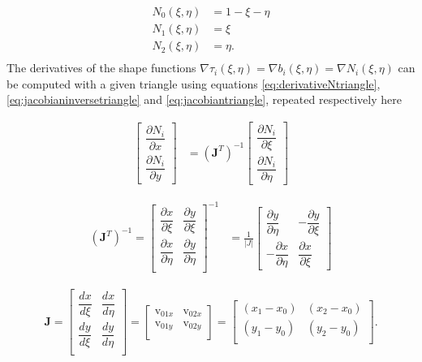 \documentclass[11pt,letterpaper,titlepage]{article}
\newcommand{\beq}{\begin{equation*}
\begin{aligned}}
\newcommand{\eeq}{\end{aligned}
\end{equation*}}
\numberwithin{equation}{section}
\begin{document}
\beq 
N_0(\xi,\eta) &= 1 - \xi - \eta \\
N_1(\xi,\eta) &= \xi \\
N_2(\xi,\eta) &= \eta. \\
\eeq 
\newline
The derivatives of the shape functions $\nabla \tau_i(\xi,\eta) = \nabla b_i(\xi,\eta) = \nabla N_i(\xi,\eta)$ can be computed with a given triangle using equations \ref{eq:derivativeNtriangle}, \ref{eq:jacobianinversetriangle} and \ref{eq:jacobiantriangle}, repeated respectively here

\begingroup
\renewcommand*{\arraystretch}{1.5}
\beq
\begin{bmatrix}
\dfrac{\partial N_i}{\partial x} \\
\dfrac{\partial N_i}{\partial y}
\end{bmatrix}
&=
(\mathbf{J}^T)^{-1}
\begin{bmatrix}
\dfrac{\partial N_i}{\partial \xi} \\
\dfrac{\partial N_i}{\partial \eta}
\end{bmatrix}
\eeq 
\endgroup

\begingroup
\renewcommand*{\arraystretch}{1.5}
\beq
(\mathbf{J}^T)^{-1} =
\begin{bmatrix}
\dfrac{\partial x}{\partial \xi}   &\dfrac{\partial y}{\partial \xi} \\
\dfrac{\partial x}{\partial \eta}   &\dfrac{\partial y}{\partial \eta} \\
\end{bmatrix}^{-1}
&=
\frac{1}{|J|}
\begin{bmatrix}
\dfrac{\partial y}{\partial \eta}   & -\dfrac{\partial y}{\partial \xi} \\
-\dfrac{\partial x}{\partial \eta}  & \dfrac{\partial x}{\partial \xi} 
\end{bmatrix}
\eeq
\endgroup

\begingroup
\renewcommand*{\arraystretch}{1.5}
\beq
\mathbf{J }= 
\begin{bmatrix}
\dfrac{dx}{d\xi}     & \dfrac{dx}{d\eta} \\
\dfrac{dy}{d\xi}     & \dfrac{dy}{d\eta} \\
\end{bmatrix}=
\begin{bmatrix}
\text{v}_{01x}  & \text{v}_{02x}  \\
\text{v}_{01y}  & \text{v}_{02y}  \\
\end{bmatrix}
=
\begin{bmatrix}
(x_1 - x_0) & (x_2 - x_0)  \\
(y_1 - y_0)  & (y_2 - y_0) \\
\end{bmatrix}.
\eeq
\endgroup
\end{document}
